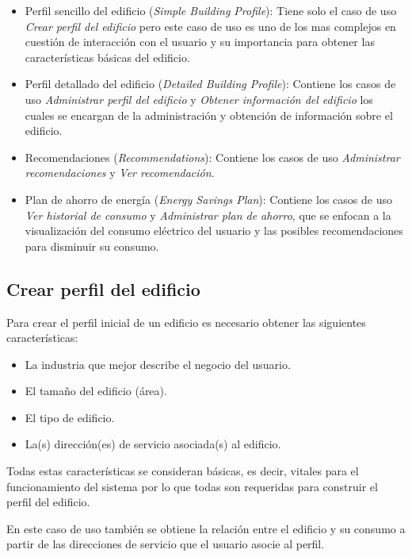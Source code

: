 \begin{itemize}
\item Perfil sencillo del edificio (\textit{Simple Building Profile}): Tiene
  solo el caso de uso \textit{Crear perfil del edificio} pero este caso de uso
  es uno de los mas complejos en cuestión de interacción con el usuario y su
  importancia para obtener las características básicas del edificio.
\item Perfil detallado del edificio (\textit{Detailed Building Profile}): Contiene
  los casos de uso \textit{Administrar perfil del edificio} y
  \textit{Obtener información del edificio} los cuales se encargan de la
  administración y obtención de información sobre el edificio.
\item Recomendaciones (\textit{Recommendations}): Contiene los casos de uso
  \textit{Administrar recomendaciones} y \textit{Ver recomendación}.
\item Plan de ahorro de energía (\textit{Energy Savings Plan}): Contiene los
  casos de uso \textit{Ver historial de consumo} y \textit{Administrar plan de
    ahorro}, que se enfocan a la visualización del consumo eléctrico del usuario
  y las posibles recomendaciones para disminuir su consumo.
\end{itemize}


\subsection{Crear perfil del edificio}

Para crear el perfil inicial de un edificio es necesario obtener las siguientes
características:

\begin{itemize}
\item La industria que mejor describe el negocio del usuario.
\item El tamaño del edificio (área).
\item El tipo de edificio.
\item La(s) dirección(es) de servicio asociada(s) al edificio.
\end{itemize}

Todas estas características se consideran básicas, es decir, vitales para el
funcionamiento del sistema por lo que todas son requeridas para construir el perfil
del edificio.

En este caso de uso también se obtiene la relación entre el edificio y su consumo
a partir de las direcciones de servicio que el usuario asocie al perfil.

